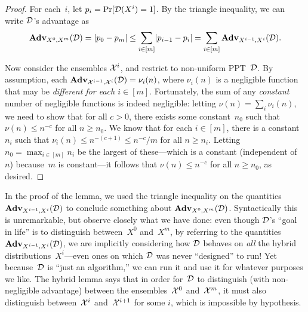 \documentclass[11pt]{article}
\begin{document}
\begin{proof}
  For each~$i$, let $p_{i} = \Pr[\mathcal{D}(X^{i}) = 1]$.
  By the triangle inequality, we can write $\mathcal{D}$'s advantage as
  \[ \mathbf{Adv}_{X^{0}, X^{m}}(\mathcal{D}) = \lvert p_{0} - p_{m}\rvert \leq \sum_{i \in [m]} \lvert p_{i-1} - p_{i}\rvert = \sum_{i \in [m]} \mathbf{Adv}_{X^{i-1},X^{i}}(\mathcal{D}) .
  \]
  
  Now consider the ensembles $\mathcal{X}^{i}$, and restrict to non-uniform PPT~$\mathcal{D}$.
  By assumption, each $\mathbf{Adv}_{\mathcal{X}^{i-1}, \mathcal{X}^{i}}(\mathcal{D}) = \nu_{i}(n)$, where $\nu_{i}(n)$ is a negligible function that may be \emph{different for each $i \in [m]$}.
  Fortunately, the sum of any \emph{constant} number of negligible functions is indeed negligible: letting $\nu(n) = \sum_{i} \nu_{i}(n)$, we need to show that for all $c > 0$, there exists some constant~$n_{0}$ such that $\nu(n) \leq n^{-c}$ for all $n \geq n_{0}$.
  We know that for each $i \in [m]$, there is a constant~$n_{i}$ such that $\nu_{i}(n) \leq n^{-(c+1)} \leq n^{-c}/m$ for all $n \geq n_{i}$.
  Letting $n_{0} = \max_{i \in [m]} n_{i}$ be the largest of these---which is a constant (independent of~$n$) because~$m$ is constant---it follows that $\nu(n) \leq n^{-c}$ for all $n \geq n_{0}$, as desired.
\end{proof}

\begin{remark}
  In the proof of the lemma, we used the triangle inequality on the quantities $\mathbf{Adv}_{X^{i-1},X^{i}}(\mathcal{D})$ to conclude something about $\mathbf{Adv}_{X^{0},X^{m}}(\mathcal{D})$.
  Syntactically this is unremarkable, but observe closely what we have done: even though $\mathcal{D}$'s ``goal in life'' is to distinguish between~$X^{0}$ and~$X^{m}$, by referring to the quantities $\mathbf{Adv}_{X^{i-1},X^{i}}(\mathcal{D})$, we are implicitly considering how $\mathcal{D}$ behaves on \emph{all} the hybrid distributions~$X^{i}$---even ones on which $\mathcal{D}$ was never ``designed'' to run!
  Yet because~$\mathcal{D}$ is ``just an algorithm,'' we can run it and use it for whatever purposes we like.
  The hybrid lemma says that in order for~$\mathcal{D}$ to distinguish (with non-negligible advantage) between the ensembles~$\mathcal{X}^{0}$ and~$\mathcal{X}^{m}$, it must also distinguish between~$\mathcal{X}^{i}$ and~$\mathcal{X}^{i+1}$ for some $i$, which is impossible by hypothesis.
\end{remark}
\end{document}
